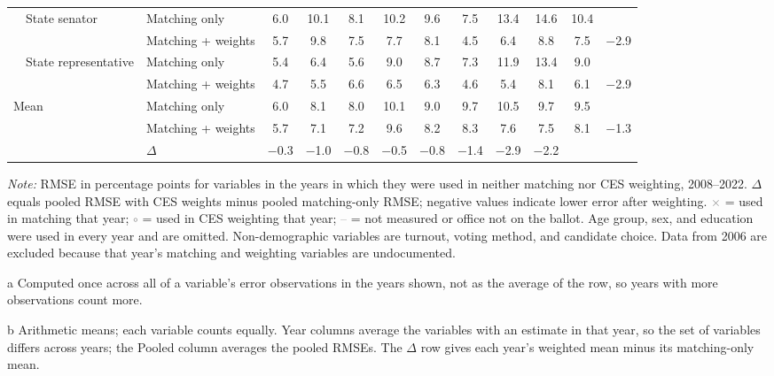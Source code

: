 \begin{table}[!htbp]
{\begin{threeparttable}
\begin{tabular}{llcccccccccc}
\addlinespace[0.1em]
~~State senator & Matching only & 6.0 & 10.1 & 8.1 & 10.2 & 9.6 & 7.5 & 13.4 & 14.6 & 10.4 & \\
 & Matching + weights & 5.7 & 9.8 & 7.5 & 7.7 & 8.1 & 4.5 & 6.4 & 8.8 & 7.5 & $-$2.9 \\
\addlinespace[0.1em]
~~State representative & Matching only & 5.4 & 6.4 & 5.6 & 9.0 & 8.7 & 7.3 & 11.9 & 13.4 & 9.0 & \\
 & Matching + weights & 4.7 & 5.5 & 6.6 & 6.5 & 6.3 & 4.6 & 5.4 & 8.1 & 6.1 & $-$2.9 \\
\midrule
Mean\tnote{b} & Matching only & 6.0 & 8.1 & 8.0 & 10.1 & 9.0 & 9.7 & 10.5 & 9.7 & 9.5 & \\
 & Matching + weights & 5.7 & 7.1 & 7.2 & 9.6 & 8.2 & 8.3 & 7.6 & 7.5 & 8.1 & $-$1.3 \\
 & $\Delta$ & $-$0.3 & $-$1.0 & $-$0.8 & $-$0.5 & $-$0.8 & $-$1.4 & $-$2.9 & $-$2.2 & & \\
\bottomrule
\end{tabular}
\begin{tablenotes}
\footnotesize
\item \textit{Note:} RMSE in percentage points for variables in the years in which they were used in neither matching nor CES weighting, 2008--2022. $\Delta$ equals pooled RMSE with CES weights minus pooled matching-only RMSE; negative values indicate lower error after weighting. \textcolor{gray}{$\times$} = used in matching that year; \textcolor{gray}{$\circ$} = used in CES weighting that year; \textcolor{gray}{--} = not measured or office not on the ballot. Age group, sex, and education were used in every year and are omitted. Non-demographic variables are turnout, voting method, and candidate choice. Data from 2006 are excluded because that year's matching and weighting variables are undocumented.
\item[a] Computed once across all of a variable's error observations in the years shown, not as the average of the row, so years with more observations count more.
\item[b] Arithmetic means; each variable counts equally. Year columns average the variables with an estimate in that year, so the set of variables differs across years; the Pooled column averages the pooled RMSEs. The $\Delta$ row gives each year's weighted mean minus its matching-only mean.
\end{tablenotes}
\end{threeparttable}%
}
\end{table}